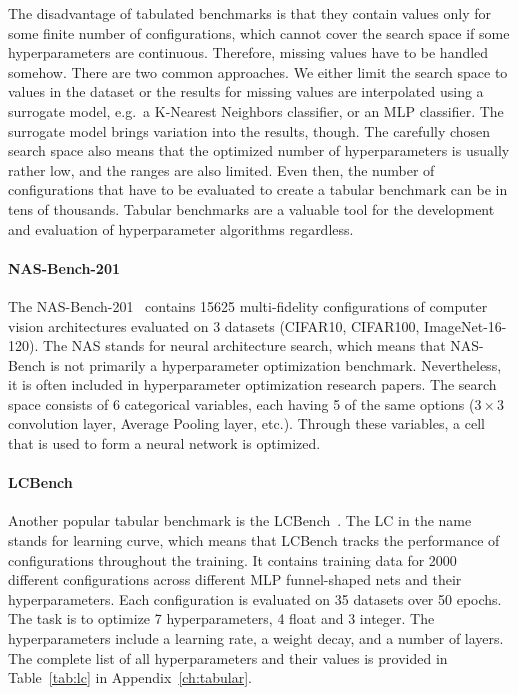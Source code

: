 The disadvantage of tabulated benchmarks is that they contain values only for some finite number of configurations, which cannot cover the search space if some hyperparameters are continuous. Therefore, missing values have to be handled somehow. There are two common approaches. We either limit the search space to values in the dataset or the results for missing values are interpolated using a surrogate model, e.g.\ a K-Nearest Neighbors classifier, or an MLP classifier. The surrogate model brings variation into the results, though. The carefully chosen search space also means that the optimized number of hyperparameters is usually rather low, and the ranges are also limited. Even then, the number of configurations that have to be evaluated to create a tabular benchmark can be in tens of thousands. Tabular benchmarks are a valuable tool for the development and evaluation of hyperparameter algorithms regardless.

\paragraph{NAS-Bench-201}
The NAS-Bench-201~\cite{dong2020nasbench201} contains 15625 multi-fidelity configurations of computer vision architectures evaluated on 3 datasets (CIFAR10, CIFAR100, ImageNet-16-120). The NAS stands for neural architecture search, which means that NAS-Bench is not primarily a hyperparameter optimization benchmark. Nevertheless, it is often included in hyperparameter optimization research papers. The search space consists of 6 categorical variables, each having 5 of the same options ($3\times3$ convolution layer, Average Pooling layer, etc.). Through these variables, a cell that is used to form a neural network is optimized.

\paragraph{LCBench}
Another popular tabular benchmark is the LCBench~\cite{ZimLin2021a}. The LC in the name stands for learning curve, which means that LCBench tracks the performance of configurations throughout the training. It contains training data for 2000 different configurations across different MLP funnel-shaped nets and their hyperparameters. Each configuration is evaluated on 35 datasets over 50 epochs. The task is to optimize 7 hyperparameters, 4 float and 3 integer. The hyperparameters include a learning rate, a weight decay, and a number of layers. The complete list of all hyperparameters and their values is provided in Table~\ref{tab:lc} in Appendix~\ref{ch:tabular}.

